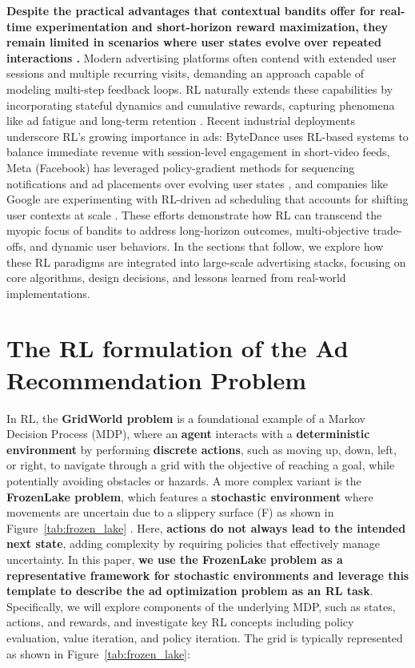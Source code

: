 \documentclass[final]{anthology-ch}         %
\begin{document}
\textbf{Despite the practical advantages that contextual bandits offer for real-time experimentation and short-horizon reward maximization, they remain limited in scenarios where user states evolve over repeated interactions \cite{Sutton1998}.} Modern advertising platforms often contend with extended user sessions and multiple recurring visits, demanding an approach capable of modeling multi-step feedback loops. RL naturally extends these capabilities by incorporating stateful dynamics and cumulative rewards, capturing phenomena like ad fatigue \cite{ccelik2023ad} and long-term retention \cite{wu2017returning}. Recent industrial deployments underscore RL’s growing importance in ads: ByteDance uses RL-based systems \cite{zhao2020jointly,zhao2021dear} to balance immediate revenue with session-level engagement in short-video feeds, Meta (Facebook) has leveraged policy-gradient methods for sequencing notifications and ad placements over evolving user states \cite{gauci2018horizon}, and companies like Google are experimenting with RL-driven ad scheduling that accounts for shifting user contexts at scale \cite{zhao2024survey}. These efforts demonstrate how RL can transcend the myopic focus of bandits to address long-horizon outcomes, multi-objective trade-offs, and dynamic user behaviors. In the sections that follow, we explore how these RL paradigms are integrated into large-scale advertising stacks, focusing on core algorithms, design decisions, and lessons learned from real-world implementations.



\section{The RL formulation of the Ad Recommendation Problem}

In RL, the \textbf{GridWorld problem }is a foundational example of a Markov Decision Process (MDP), where an \textbf{agent} interacts with a \textbf{deterministic environment} by performing \textbf{discrete actions}, such as moving up, down, left, or right, to navigate through a grid with the objective of reaching a goal, while potentially avoiding obstacles or hazards. A more complex variant is the \textbf{FrozenLake problem}, which features a \textbf{stochastic environment} where movements are uncertain due to a slippery surface (\textcolor[HTML]{1E90FF}{F}) as shown in Figure~\ref{tab:frozen_lake} \cite{FrozenLakeGymnasium2023}. Here, \textbf{actions do not always lead to the intended next state}, adding complexity by requiring policies that effectively manage uncertainty. In this paper, \textbf{we use the FrozenLake problem as a representative framework for stochastic environments and leverage this template to describe the ad optimization problem as an RL task}. Specifically, we will explore components of the underlying MDP, such as states, actions, and rewards, and investigate key RL concepts including policy evaluation, value iteration, and policy iteration. The grid is typically represented as shown in Figure~\ref{tab:frozen_lake}:
\end{document}
